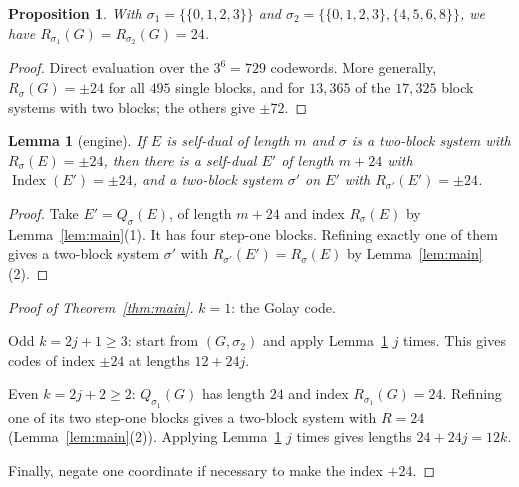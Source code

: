 \documentclass[11pt]{amsart}
\newtheorem{lemma}[theorem]{Lemma}
\newtheorem{proposition}[theorem]{Proposition}
\theoremstyle{definition}
\newcommand{\Index}{\operatorname{Index}}
\begin{document}
\begin{proposition}\label{prop:base}
With $\sigma_1=\{\{0,1,2,3\}\}$ and $\sigma_2=\{\{0,1,2,3\},\{4,5,6,8\}\}$, we have
$R_{\sigma_1}(G)=R_{\sigma_2}(G)=24$.
\end{proposition}

\begin{proof}
Direct evaluation over the $3^6=729$ codewords. More generally, $R_\sigma(G)=\pm24$ for all
$495$ single blocks, and for $13{,}365$ of the $17{,}325$ block systems with two blocks; the others give $\pm72$.
\end{proof}

\begin{lemma}[engine]\label{lem:engine}
If $E$ is self-dual of length $m$ and $\sigma$ is a two-block system with $R_\sigma(E)=\pm24$, then
there is a self-dual $E'$ of length $m+24$ with $\Index(E')=\pm24$, and a two-block system
$\sigma'$ on $E'$ with $R_{\sigma'}(E')=\pm24$.
\end{lemma}

\begin{proof}
Take $E'=Q_\sigma(E)$, of length $m+24$ and index $R_\sigma(E)$ by Lemma~\ref{lem:main}(1). It
has four step-one blocks. Refining exactly one of them gives a two-block system $\sigma'$ with
$R_{\sigma'}(E')=R_\sigma(E)$ by Lemma~\ref{lem:main}(2).
\end{proof}

\begin{proof}[Proof of Theorem~\ref{thm:main}]
$k=1$: the Golay code.

Odd $k=2j+1\ge3$: start from $(G,\sigma_2)$ and apply Lemma~\ref{lem:engine} $j$ times. This
gives codes of index $\pm24$ at lengths $12+24j$.

Even $k=2j+2\ge2$: $Q_{\sigma_1}(G)$ has length $24$ and index $R_{\sigma_1}(G)=24$. Refining one of its
two step-one blocks gives a two-block system with $R=24$ (Lemma~\ref{lem:main}(2)). Applying
Lemma~\ref{lem:engine} $j$ times gives lengths $24+24j=12k$.

Finally, negate one coordinate if necessary to make the index $+24$.
\end{proof}
\end{document}
